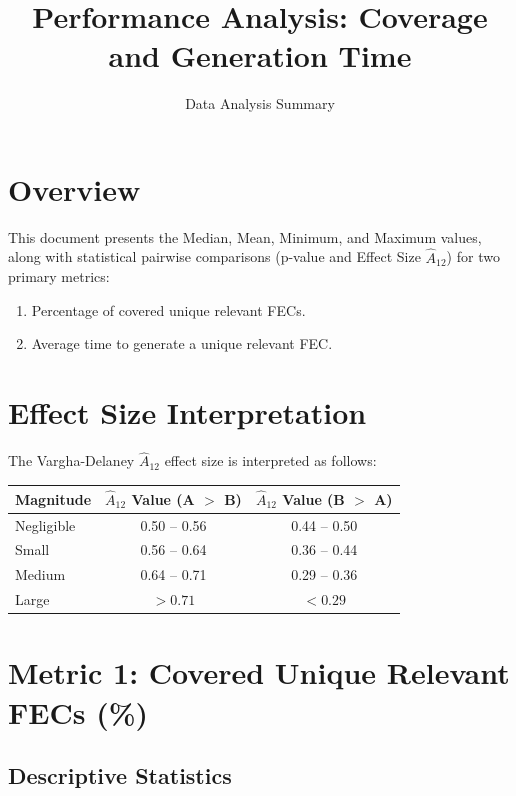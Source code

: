 \documentclass[10pt,a4paper]{article}
\title{Performance Analysis: Coverage and Generation Time}
\author{Data Analysis Summary}
\date{}
\begin{document}
\maketitle

\section{Overview}
This document presents the Median, Mean, Minimum, and Maximum values, along with statistical pairwise comparisons (p-value and Effect Size $\hat{A}_{12}$) for two primary metrics:
\begin{enumerate}
    \item Percentage of covered unique relevant FECs.
    \item Average time to generate a unique relevant FEC.
\end{enumerate}

\section{Effect Size Interpretation}
The Vargha-Delaney $\hat{A}_{12}$ effect size is interpreted as follows:

\begin{table}[H]
\centering
\begin{tabular}{lcc}
\toprule
\textbf{Magnitude} & \textbf{$\hat{A}_{12}$ Value (A $>$ B)} & \textbf{$\hat{A}_{12}$ Value (B $>$ A)} \\
\midrule
Negligible & 0.50 -- 0.56 & 0.44 -- 0.50 \\
Small & 0.56 -- 0.64 & 0.36 -- 0.44 \\
Medium & 0.64 -- 0.71 & 0.29 -- 0.36 \\
Large & $> 0.71$ & $< 0.29$ \\
\bottomrule
\end{tabular}
\end{table}

\newpage

\section{Metric 1: Covered Unique Relevant FECs (\%)}

\subsection{Descriptive Statistics}
\end{document}
